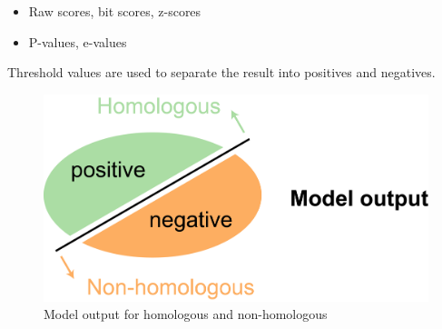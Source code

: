 \begin{itemize}
\item Raw scores, bit scores, z-scores
\item P-values, e-values
\end{itemize}

\noindent
Threshold values are used to separate the result into positives and negatives.

\begin{figure}[H]
  \centering
      \includegraphics[width=0.4 \textwidth]{fig07/model_output.png}
  \caption{Model output for homologous and non-homologous}
\end{figure}

\bigskip 

%
